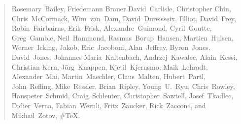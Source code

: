 \begin{quote}
\flushleft
Rosemary~Bailey,        %
Friedemann Brauer       %
David~Carlisle,         %
Christopher Chin,       %
Chris~McCormack,        %
Wim~van~Dam,            %
David~Dureisseix,       %
Elliot,                 %
David~Frey,             %
Robin~Fairbairns,       %
Erik~Frisk,		%
Alexandre~Guimond,      %
Cyril~Goutte,           %
Greg~Gamble,            %
Neil~Hammond,           %
Rasmus~Borup~Hansen,    %
Martien~Hulsen,         %
Werner~Icking,          %
Jakob,                  %
Eric~Jacoboni,          %
Alan~Jeffrey,           %
Byron~Jones,            %
David~Jones,            %
Johannes-Maria~Kaltenbach, %
Andrzej~Kawalec,        %
Alain~Kessi,            %
Christian Kern,         %
J\"org~Knappen,         %
Kjetil~Kjernsmo,        %
Maik~Lehradt,           %
Alexander~Mai,		%
Martin~Maechler,        %
Claus~Malten,           %
Hubert~Partl,           %
John~Refling,           %
Mike~Ressler,           %
Brian~Ripley,           %
Young~U.~Ryu,           %
Chris~Rowley,           %
Hanspeter~Schmid,       %
Craig~Schlenter,        %
Christopher~Sawtell,    %
Josef~Tkadlec,          %
Didier~Verna,           %
Fabian~Wernli,          %
Fritz~Zaucker,          %
Rick~Zaccone,           %
and Mikhail~Zotov,      %
\#TeX.
\end{quote}




\pagebreak
\endinput
